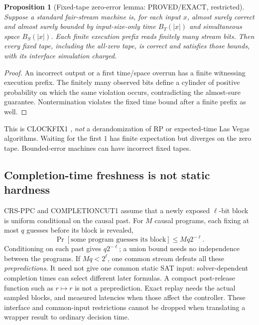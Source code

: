 \documentclass[11pt]{article}
\newtheorem{proposition}[theorem]{Proposition}
\begin{document}
\begin{proposition}[Fixed-tape zero-error lemma: PROVED/EXACT, restricted]
Suppose a standard fair-stream machine is, for each input $x$, almost surely
correct and almost surely bounded by input-size-only time $B_T(|x|)$ and
simultaneous space $B_S(|x|)$. Each finite execution prefix reads finitely many
stream bits. Then every fixed tape, including the all-zero tape, is correct
and satisfies those bounds, with its interface simulation charged.
\end{proposition}
\begin{proof}
An incorrect output or a first time/space overrun has a finite witnessing
execution prefix. The finitely many observed bits define a cylinder of
positive probability on which the same violation occurs, contradicting the
almost-sure guarantee. Nontermination violates the fixed time bound after a
finite prefix as well.
\end{proof}
This is CLOCKFIX1 \cite{clockfix}, \emph{not} a derandomization of RP or
expected-time Las Vegas algorithms. Waiting for the first $1$ has finite
expectation but diverges on the zero tape. Bounded-error machines can have
incorrect fixed tapes.

\subsection*{Completion-time freshness is not static hardness}
CRS-PPC and COMPLETIONCUT1 \cite{crs,completion} assume that a newly exposed
$\ell$-bit block is uniform conditional on the causal past. For $M$ causal
programs, each fixing at most $q$ guesses before its block is revealed,
\[
 \Pr[\text{some program guesses its block}]\le Mq2^{-\ell}.
\]
Conditioning on each past gives $q2^{-\ell}$; a union bound needs no
independence between the programs. If $Mq<2^\ell$, one common stream defeats
all these \emph{prepredictions}. It need not give one common static SAT input:
solver-dependent completion times can select different later formulas.
A compact post-release function such as $r\mapsto r$ is not a preprediction.
Exact replay needs the actual sampled blocks, and measured latencies when
those affect the controller. These interface and common-input restrictions
cannot be dropped when translating a wrapper result to ordinary decision time.

\newpage
\end{document}
